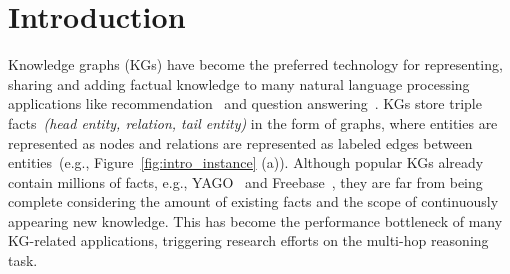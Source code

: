\section{Introduction}
\label{sec:introduction}


Knowledge graphs (KGs) have become the preferred technology for representing, sharing and adding factual knowledge to
many natural language processing applications like recommendation~\cite{wang2019explainable,Lei2020Conversational}
and question answering~\cite{xiao2019wsdm,zhang2018variational}.
KGs store triple facts~\textit{(head entity, relation, tail entity)} in the form of graphs, where entities are represented as nodes and relations are represented as labeled edges between entities~(e.g., Figure~\ref{fig:intro_instance} (a)).
Although popular KGs already contain millions of facts, e.g., YAGO~\cite{suchanek2007yago} and Freebase~\cite{freebase2008}, they are far from being complete considering the amount of existing facts and the scope of continuously appearing new knowledge. 
This has become the performance bottleneck of many KG-related applications, triggering
research efforts on the multi-hop reasoning task.

